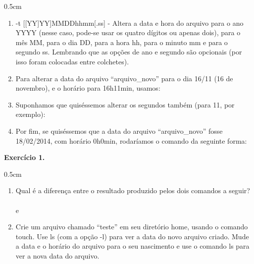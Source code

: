 \begin{refsection}
\begin {myindentpar}{0.5cm}
\begin{enumerate}[\itshape i.]
 \item{-t [[YY]YY]MMDDhhmm[.ss] - } Altera a data e hora do arquivo para o ano YYYY (nesse caso, pode-se usar os quatro dígitos ou apenas dois), para o mês MM, para o dia DD, para a hora hh, para o minuto mm e para o segundo ss. Lembrando que as opções de ano e segundo são opcionais (por isso foram colocadas entre colchetes).

 \item{Para alterar a data do arquivo ``arquivo\_novo'' para o dia 16/11 (16 de novembro), e o horário para 16h11min, usamos:}

 \item{Suponhamos que quiséssemos alterar os segundos também (para 11, por exemplo):}

 \item{Por fim, se quiséssemos que a data do arquivo ``arquivo\_novo'' fosse 18/02/2014, com horário 0h0min, rodaríamos o comando da seguinte forma:}


 \end{enumerate}
 \end{myindentpar}

\begin{blackBlock}{\textbf{Exercício 1.}}\label{tut1:ex:1.\arabic{ex}}

 \begin {myindentpar}{0.5cm}
 \begin{enumerate}[\itshape i.]
  \item{Qual é a diferença entre o resultado produzido pelos dois comandos a seguir?}
\\
	\\
e\\

 \item{Crie um arquivo chamado ``teste'' em seu diretório home, usando o comando touch. Use ls (com a opção -l) para ver a data do novo arquivo criado. Mude a data e o horário do arquivo para o seu nascimento e use o comando ls para ver a nova data do arquivo.}

 \end{enumerate}
 \end{myindentpar}

\end{blackBlock}


\end{refsection}
